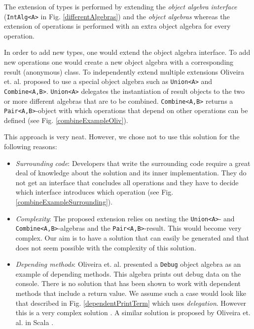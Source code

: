 \documentclass{report}
\begin{document}
The extension of types is performed by extending the \emph{object algebra interface} (\lstinline{IntAlg<A>} in Fig. \ref{differentAlgebras}) and the \emph{object algebras} whereas the extension of operations is performed with an extra object algebra for every operation.

In order to add new types, one would extend the object algebra interface. To add new operations one would create a new object algebra with a corresponding result (anonymous) class. To independently extend multiple extensions Oliveira et. al. proposed to use a special object algebra such as \lstinline{Union<A>} and \lstinline{Combine<A,B>}. \lstinline{Union<A>} delegates the instantiation of result objects to the two or more different algebras that are to be combined. \lstinline{Combine<A,B>} returns a \lstinline{Pair<A,B>}-object with which operations that depend on other operations can be defined (see Fig. \ref{combineExampleOliv}).

This approach is very neat. However, we chose not to use this solution for the following reasons:

\begin{itemize}
  \item \emph{Surrounding code}: Developers that write the surrounding code require a great deal of knowledge about the solution and its inner implementation. They do not get an interface that concludes all operations and they have to decide which interface introduces which operation (see Fig. \ref{combineExampleSurrounding}).
  \item \emph{Complexity}: The proposed extension relies on nesting the \lstinline{Union<A>}- and \lstinline{Combine<A,B>}-algebras and the \lstinline{Pair<A,B>}-result. This would become very complex. Our aim is to have a solution that can easily be generated and that does not seem possible with the complexity of this solution.
  \item \emph{Depending methods}: Oliveira et. al. presented a \lstinline{Debug} object algebra as an example of depending methods. This algebra prints out debug data on the console. There is no solution that has been shown to work with dependent methods that include a return value. We assume such a case would look like that described in Fig. \ref{dependentPrintTerm} which uses \emph{delegation}. However this is a very complex solution \cite{Tempero-Multiple-2000}. A similar solution is proposed by Oliveira et. al. in Scala \cite{Oliv-Feature-2013}.
\end{itemize}
\end{document}

